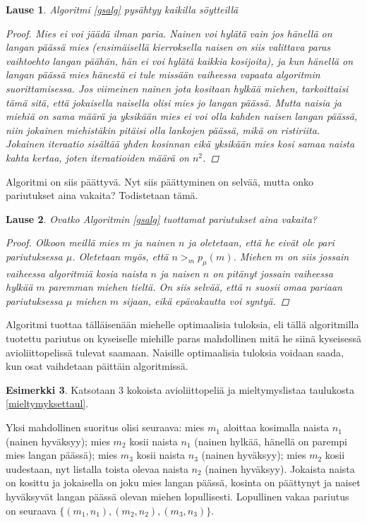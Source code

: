 \documentclass[finnish]{tktltiki2}
\newtheorem{lau}{Lause}
\theoremstyle{definition}
\newtheorem{esim}[lau]{Esimerkki}
\theoremstyle{remark}
\begin{document}
\begin{lau}
Algoritmi \ref{gsalg} pysähtyy kaikilla söytteillä
\begin{proof}
Mies ei voi jäädä ilman paria. Nainen voi hylätä vain jos hänellä on langan päässä mies (ensimäisellä kierroksella naisen on siis valittava paras vaihtoehto langan päähän, hän ei voi hylätä kaikkia kosijoita), ja kun hänellä on langan päässä mies hänestä ei tule missään vaiheessa vapaata algoritmin suorittamisessa.
Jos viimeinen nainen jota kositaan hylkää miehen, tarkoittaisi tämä sitä, että jokaisella naisella olisi mies jo langan päässä. Mutta naisia ja miehiä on sama määrä ja yksikään mies ei voi olla kahden naisen langan päässä, niin jokainen miehistäkin pitäisi olla lankojen päässä, mikä on ristiriita.
Jokainen iteraatio sisältää yhden kosinnan eikä yksikään mies kosi samaa naista kahta kertaa, joten iteraatioiden määrä on $n^2$.
\end{proof}
\end{lau}
Algoritmi on siis päättyvä. Nyt siis päättyminen on selvää, mutta onko pariutukset aina vakaita?
Todistetaan tämä.
\begin{lau}
Ovatko Algoritmin \ref{gsalg} tuottamat pariutukset aina vakaita?
\begin{proof}\cite[p. 588]{gale62a}
Olkoon meillä mies $m$ ja nainen $n$ ja oletetaan, että he eivät ole pari pariutuksessa $\mu$. Oletetaan myös, että $n >_{m} p_{\mu}(m)$. Miehen $m$ on siis jossain vaiheessa algoritmiä kosia naista $n$ ja naisen $n$ on pitänyt jossain vaiheessa hylkää $m$ paremman miehen tieltä. On siis selvää, että $n$ suosii omaa pariaan pariutuksessa $\mu$ miehen $m$ sijaan, eikä epävakautta voi syntyä.
\end{proof}
\end{lau}
Algoritmi tuottaa tälläisenään miehelle optimaalisia tuloksia, eli tällä algoritmilla tuotettu pariutus on kyseiselle miehille paras mahdollinen mitä he siinä kyseisessä avioliittopelissä tulevat saamaan.
Naisille optimaalisia tuloksia voidaan saada, kun osat vaihdetaan päittäin algoritmissä.

\begin{esim}
	Katsotaan 3 kokoista avioliittopeliä ja mieltymyslistaa taulukosta \ref{mieltymyksettaul}.
	
	Yksi mahdollinen suoritus olisi seuraava: mies $m_1$ aloittaa kosimalla naista $n_1$ (nainen hyväksyy); mies $m_2$ kosii naista $n_1$ (nainen hylkää, hänellä on parempi mies langan päässä); mies $m_3$ kosii naista $n_3$ (nainen hyväksyy); mies $m_2$ kosii uudestaan, nyt listalla toista olevaa naista $n_2$ (nainen hyväksyy). Jokaista naista on kosittu ja jokaisella on joku mies langan päässä, kosinta on päättynyt ja naiset hyväksyvät langan päässä olevan miehen lopullisesti. Lopullinen vakaa pariutus on seuraava $\{(m_1, n_1), (m_2, n_2), (m_3, n_3)\}$.
\end{esim}
\end{document}
